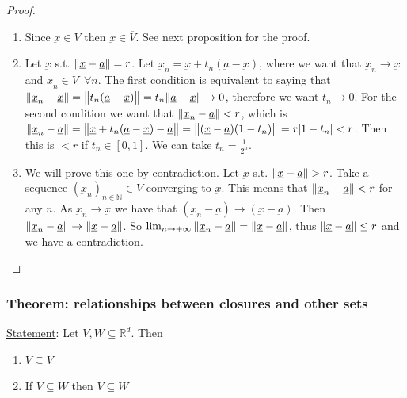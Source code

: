 \documentclass[10pt]{extarticle}
\newcommand{\R}{\mathbb{R}}
\newcommand{\N}{\mathbb{N}}
\newcommand{\munderbar}[1]{\underbar{\ensuremath{#1}}}
\begin{document}
\begin{proof}
    \begin{enumerate}
        \item Since $\munderbar{x} \in V$ then $\munderbar{x} \in \overline{V}$. See next proposition for the proof.
        \item Let $\munderbar{x}$ s.t. $\norm{\munderbar{x} - \munderbar{a}} = r$.
              Let $\munderbar{x}_n = \munderbar{x} + t_n(\munderbar{a} - \munderbar{x})$, where we want that $\munderbar{x}_n \to \munderbar{x}$ and $\munderbar{x}_n \in V \enspace \forall n$.
              The first condition is equivalent to saying that $\norm{\munderbar{x}_n - \munderbar{x}} = \norm{t_n(\munderbar{a} - \munderbar{x})} = t_n \norm{\munderbar{a} - \munderbar{x}} \to 0$, therefore we want $t_n \to 0$.
              For the second condition we want that $\norm{\munderbar{x}_n - \munderbar{a}} < r$, which is
              $\norm{\munderbar{x}_n - \munderbar{a}} = \norm{\munderbar{x} + t_n(\munderbar{a} - \munderbar{x}) - \munderbar{a}} = \norm{(\munderbar{x} - \munderbar{a})(1 - t_n)} = r \abs{1 - t_n} < r$. Then this is $< r$ if $t_n \in [0, 1]$.
              We can take $t_n = \frac{1}{2^n}$.
        \item We will prove this one by contradiction. Let $\munderbar{x}$ s.t. $\norm{\munderbar{x} - \munderbar{a}} > r$.
              Take a sequence $\left(\munderbar{x}_n\right)_{n \in \N} \in V$ converging to $\munderbar{x}$.
              This means that $\norm{\munderbar{x}_n - \munderbar{a}} < r$ for any $n$.
              As $\munderbar{x}_n \to \munderbar{x}$ we have that $(\munderbar{x}_n - \munderbar{a}) \to (\munderbar{x} - \munderbar{a})$.
              Then $\norm{\munderbar{x}_n - \munderbar{a}} \to \norm{\munderbar{x} - \munderbar{a}}$.
              So $\lim_{n \to +\infty} \norm{\munderbar{x}_n - \munderbar{a}} = \norm{\munderbar{x} - \munderbar{a}}$, thus $\norm{\munderbar{x} - \munderbar{a}} \leq r$ and we have a contradiction.
    \end{enumerate}
\end{proof}

\subsubsection{Theorem: relationships between closures and other sets}

\underline{Statement}: Let $V, W \subseteq \R^d$.
Then

\begin{enumerate}
    \item $V \subseteq \overline{V}$
    \item If $V \subseteq W$ then $\overline{V} \subseteq \overline{W}$
\end{enumerate}
\end{document}

